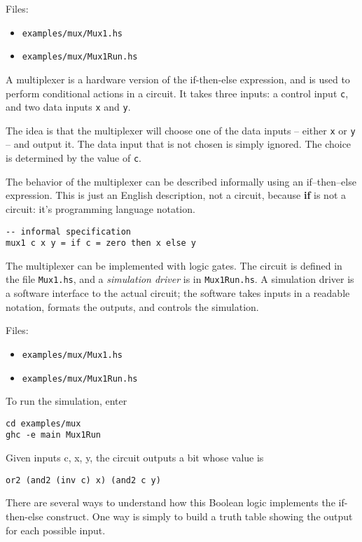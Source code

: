 \documentclass[11pt]{article}
\begin{document}
Files:
\begin{itemize}
\item \texttt{examples/mux/Mux1.hs}
\item \texttt{examples/mux/Mux1Run.hs}
\end{itemize}

A multiplexer is a hardware version of the if-then-else expression,
and is used to perform conditional actions in a circuit.  It takes
three inputs: a control input \texttt{c}, and two data inputs \texttt{x} and \texttt{y}.

The idea is that the multiplexer will choose one of the data inputs --
either \texttt{x} or \texttt{y} -- and output it.  The data input that is not chosen is
simply ignored.  The choice is determined by the value of \texttt{c}.

The behavior of the multiplexer can be described informally using an
if--then--else expression.  This is just an English description, not a
circuit, because \textbf{if} is not a circuit: it's programming language
notation.

\begin{verbatim}
-- informal specification
mux1 c x y = if c = zero then x else y
\end{verbatim}

The multiplexer can be implemented with logic gates.  The circuit is
defined in the file \texttt{Mux1.hs}, and a \emph{simulation driver} is in
\texttt{Mux1Run.hs}.  A simulation driver is a software interface to the
actual circuit; the software takes inputs in a readable notation,
formats the outputs, and controls the simulation.

Files:
\begin{itemize}
\item \texttt{examples/mux/Mux1.hs}
\item \texttt{examples/mux/Mux1Run.hs}
\end{itemize}

To run the simulation, enter  

\begin{verbatim}
cd examples/mux
ghc -e main Mux1Run
\end{verbatim}

Given inputs c, x, y, the circuit outputs a bit whose value is

\begin{verbatim}
or2 (and2 (inv c) x) (and2 c y)
\end{verbatim}

There are several ways to understand how this Boolean logic implements
the if-then-else construct.  One way is simply to build a truth table
showing the output for each possible input.
\end{document}

